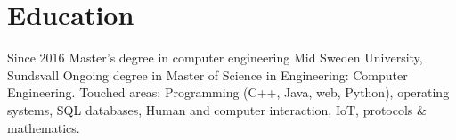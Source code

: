 \section{Education}



\begin{entrylist}
  \entry
    {Since 2016}
    {Master's degree in computer engineering}
    {Mid Sweden University, Sundsvall}
    {%
      Ongoing degree in Master of Science in Engineering: Computer\\Engineering. Touched areas: Programming (C++, Java, web, Python), operating systems, SQL databases, Human and computer interaction, IoT, protocols \& mathematics.
      }
\end{entrylist}